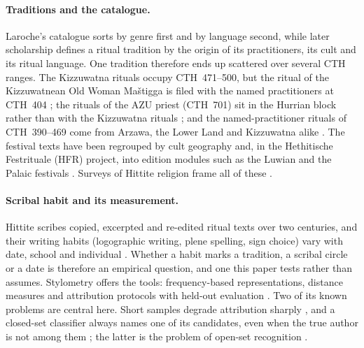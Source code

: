 \documentclass{ceurart}
\newcommand{\CTH}[1]{CTH~#1}
\begin{document}
\paragraph{Traditions and the catalogue.}
Laroche's catalogue sorts by genre first and by language second, while later scholarship
defines a ritual tradition by the origin of its practitioners, its cult and its ritual
language. One tradition therefore ends up scattered over several CTH ranges. The Kizzuwatna
rituals occupy \CTH{471}--500, but the ritual of the Kizzuwatnean Old Woman Maštigga is filed
with the named practitioners at \CTH{404} \cite{miller2004studies}; the rituals of the AZU
priest (\CTH{701}) sit in the Hurrian block rather than with the Kizzuwatna rituals
\cite{salvini1986chs}; and the named-practitioner rituals of \CTH{390}--469 come from Arzawa,
the Lower Land and Kizzuwatna alike \cite{christiansen2006ambazzi,bawanypeck2005auguren}. The
festival texts have been regrouped by cult geography \cite{gordin2025matters,gorke2022hurrian,
trameri2024kizzuwatna} and, in the Hethitische Festrituale (HFR) project, into edition modules
such as the Luwian and the Palaic festivals \cite{hfr,gorke2020hatti}. Surveys of Hittite
religion frame all of these \cite{haas1994geschichte,taracha2009religions}.

\paragraph{Scribal habit and its measurement.}
Hittite scribes copied, excerpted and re-edited ritual texts over two centuries, and their
writing habits (logographic writing, plene spelling, sign choice) vary with date, school and
individual \cite{gordin2015scribal,weeden2011logograms,vandenhout2009dating,
vandenhout2020literacy,waal2015diplomatics}. Whether a habit marks a tradition, a scribal circle
or a date is therefore an empirical question, and one this paper tests rather than assumes.
Stylometry offers the tools: frequency-based representations, distance measures and
attribution protocols with held-out evaluation \cite{burrows2002delta,juola2008authorship,
stamatatos2009survey}. Two of its known problems are central here. Short samples degrade
attribution sharply \cite{eder2015size}, and a closed-set classifier always names one of its
candidates, even when the true author is not among them \cite{koppel2011wild}; the latter is
the problem of open-set recognition \cite{scheirer2013openset}.
\end{document}

